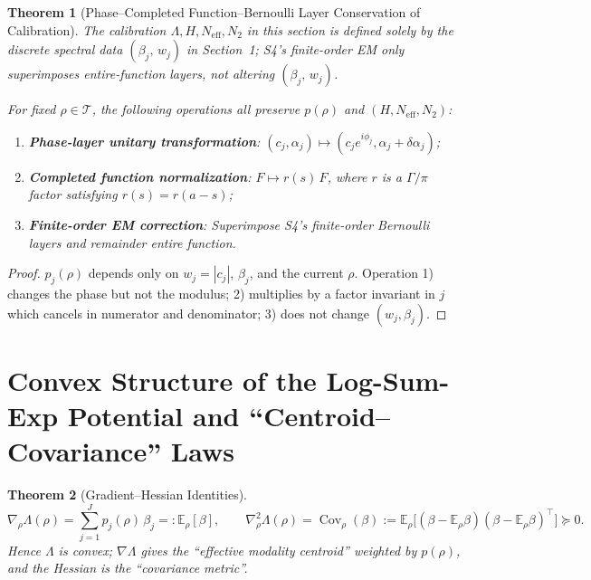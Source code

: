 \documentclass[11pt,a4paper]{article}
\newtheorem{theorem}{Theorem}[section]
\theoremstyle{remark}
\DeclareMathOperator{\Cov}{Cov}
\begin{document}
\begin{theorem}[Phase--Completed Function--Bernoulli Layer Conservation of Calibration]\label{thm:conservation}
The calibration $\Lambda,H,N_{\mathrm{eff}},N_2$ in this section is defined solely by the discrete spectral data $(\beta_j,\,w_j)$ in Section~1; S4's finite-order EM only superimposes entire-function layers, not altering $(\beta_j,\,w_j)$.

For fixed $\rho\in\mathcal{T}$, the following operations all preserve $p(\rho)$ and $(H,N_{\mathrm{eff}},N_2)$:
\begin{enumerate}
\item \textbf{Phase-layer unitary transformation}: $(c_j,\alpha_j)\mapsto (c_j e^{i\phi_j},\alpha_j+\delta\alpha_j)$;
\item \textbf{Completed function normalization}: $F\mapsto r(s)\,F$, where $r$ is a $\Gamma/\pi$ factor satisfying $r(s)=r(a-s)$;
\item \textbf{Finite-order EM correction}: Superimpose S4's finite-order Bernoulli layers and remainder entire function.
\end{enumerate}
\end{theorem}

\begin{proof}
$p_j(\rho)$ depends only on $w_j=|c_j|$, $\beta_j$, and the current $\rho$. Operation 1) changes the phase but not the modulus; 2) multiplies by a factor invariant in $j$ which cancels in numerator and denominator; 3) does not change $(w_j,\beta_j)$.
\end{proof}

\section{Convex Structure of the Log-Sum-Exp Potential and ``Centroid--Covariance'' Laws}\label{sec:convex}

\begin{theorem}[Gradient--Hessian Identities]\label{thm:grad_hess}
\begin{equation}
\nabla_\rho \Lambda(\rho)=\sum_{j=1}^J p_j(\rho)\,\beta_j=:\mathbb{E}_\rho[\beta],\qquad
\nabla_\rho^2 \Lambda(\rho)=\Cov_\rho(\beta):=\mathbb{E}_\rho\big[(\beta-\mathbb{E}_\rho\beta)(\beta-\mathbb{E}_\rho\beta)^\top\big]\succeq 0.
\end{equation}
Hence $\Lambda$ is convex; $\nabla\Lambda$ gives the ``effective modality centroid'' weighted by $p(\rho)$, and the Hessian is the ``covariance metric''.
\end{theorem}
\end{document}
